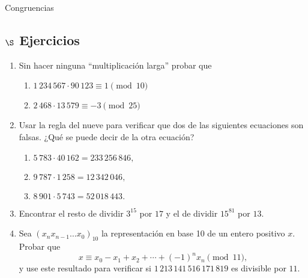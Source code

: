 \begin{section}{Congruencias}




\subsection*{$\S$ Ejercicios}
\begin{enumerate}
\item Sin hacer ninguna ``multiplicación larga'' probar que
\begin{enumerate}
    \item $1\,234\,567 \cdot 90\,123 \equiv 1 \pmod{10}$
    
    \item $2\,468 \cdot 13\,579 \equiv -3 \pmod{25}$
\end{enumerate}
\item Usar la regla del nueve para verificar que dos de las siguientes ecuaciones son falsas. ¿Qué se puede decir de la otra ecuación?
\begin{enumerate}
    \item  $5\,783 \cdot 40\,162  = 233\,256\,846 ,$
    
    \item  $9\,787 \cdot 1\,258  = 12\,342\,046 , $
    
    \item  $ 8\,901 \cdot 5\,743  = 52\,018\,443 .$
\end{enumerate}
\item Encontrar el resto de dividir $3^{15}$ por $17$ y el de dividir $15^{81}$ por $13$.
\item  Sea $(x_nx_{n-1}\ldots x_0)_{10}$ la representación en base 10 de un entero positivo $x$. Probar que
$$
x\equiv x_0-x_1+x_2+\cdots +(-1)^nx_n \pmod{11},
$$
y use este resultado para verificar si $1\,213\,141\,516\,171\,819$
es divisible por $11$.
\end{enumerate}
\end{section}


